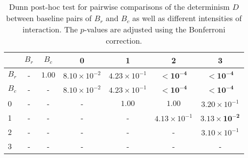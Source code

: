 \begin{table}
\centering
\caption{Dunn post-hoc test for pairwise comparisons of the determinism $D$ between baseline pairs of $B_r$ and $B_c$ as well as different intensities of interaction. The $p$-values are adjusted using the Bonferroni correction.}
\label{tab:dunn_determinism}
\begin{tabular}{lcccccc}
\toprule
 & $B_r$ & $B_c$ & 0 & 1 & 2 & 3 \\
\midrule
$B_r$ & - & $1.00$ & $8.10 \times 10^{-2}$ & $4.23 \times 10^{-1}$ & $\mathbf{< 10^{-4}}$ & $\mathbf{< 10^{-4}}$ \\
$B_c$ & - & - & $8.10 \times 10^{-2}$ & $4.23 \times 10^{-1}$ & $\mathbf{< 10^{-4}}$ & $\mathbf{< 10^{-4}}$ \\
0 & - & - & - & $1.00$ & $1.00$ & $3.20 \times 10^{-1}$ \\
1 & - & - & - & - & $4.13 \times 10^{-1}$ & $\mathbf{3.13 \times 10^{-2}}$ \\
2 & - & - & - & - & - & $3.10 \times 10^{-1}$ \\
3 & - & - & - & - & - & - \\
\bottomrule
\end{tabular}
\end{table}

